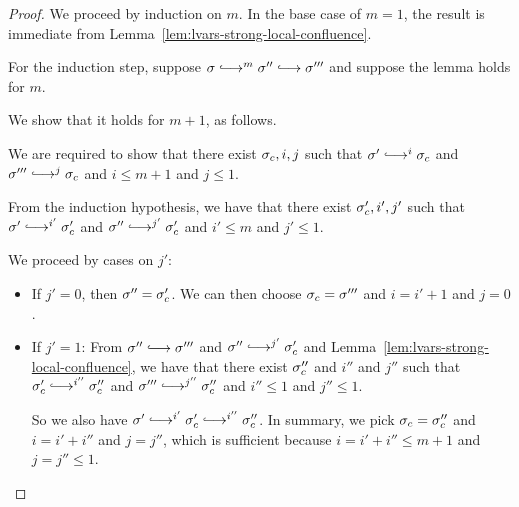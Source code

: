 \begin{proof}

  We proceed by induction on $m$.  In the base case of $m = 1$, the
  result is immediate from
  Lemma~\ref{lem:lvars-strong-local-confluence}.

  For the induction step, suppose $\conf \parstepsto^m \conf''
  \parstepsto \conf'''$ and suppose the lemma holds for $m$.

  We show that it holds for $m + 1$, as follows.

  We are required to show that there exist $\sigma_c, i, j$ such that
  $\conf' \parstepsto^{i} \conf_c$ and $\conf''' \parstepsto^{j}
  \conf_c$ and $i \leq m + 1$ and $j \leq 1$.

  From the induction hypothesis, we have that there exist $\sigma_c',
  i', j'$ such that $\conf' \parstepsto^{i'} \conf_c'$ and $\conf''
  \parstepsto^{j'} \conf_c'$ and $i' \leq m$ and $j' \leq 1$.

  We proceed by cases on $j'$:
  \begin{itemize}

  \item If $j' = 0$, then $\sigma'' = \sigma_c'$.  We can then
    choose $\sigma_c = \sigma'''$ and $i = i' + 1$ and $j = 0$.
    
  \item If $j' = 1$: From $\conf'' \parstepsto \conf'''$ and $\conf''
    \parstepsto^{j'} \conf_c'$ and
    Lemma~\ref{lem:lvars-strong-local-confluence}, we have that there
    exist $\sigma_c''$ and $i''$ and $j''$ such that $\conf'_c
    \parstepsto^{i''} \conf_c''$ and $\conf''' \parstepsto^{j''}
    \conf_c''$ and $i'' \leq 1$ and $j'' \leq 1$.

    So we also have $\conf' \parstepsto^{i'} \conf_c'
    \parstepsto^{i''} \conf_c''$.  In summary, we pick $\sigma_c =
    \sigma_c''$ and $i = i' + i''$ and $j = j''$, which is sufficient
    because $i = i' + i'' \leq m + 1$ and $j = j'' \leq 1$.
  \end{itemize}

 \end{proof}
